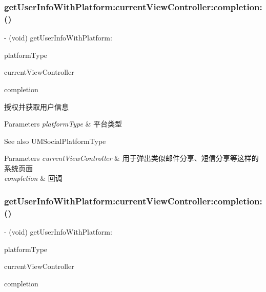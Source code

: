\subsubsection{\texorpdfstring{get\+User\+Info\+With\+Platform\+:current\+View\+Controller\+:completion\+:()}{getUserInfoWithPlatform:currentViewController:completion:()}\hspace{0.1cm}{\footnotesize\ttfamily [1/2]}}
{\footnotesize\ttfamily -\/ (void) get\+User\+Info\+With\+Platform\+: \begin{DoxyParamCaption}\item[{(U\+M\+Social\+Platform\+Type)}]{platform\+Type }\item[{currentViewController:(id)}]{current\+View\+Controller }\item[{completion:(U\+M\+Social\+Request\+Completion\+Handler)}]{completion }\end{DoxyParamCaption}}

授权并获取用户信息 
\begin{DoxyParams}{Parameters}
{\em platform\+Type} & 平台类型 \\
\hline
\end{DoxyParams}
\begin{DoxySeeAlso}{See also}
U\+M\+Social\+Platform\+Type 
\end{DoxySeeAlso}

\begin{DoxyParams}{Parameters}
{\em current\+View\+Controller} & 用于弹出类似邮件分享、短信分享等这样的系统页面 \\
\hline
{\em completion} & 回调 \\
\hline
\end{DoxyParams}
\mbox{\label{interface_u_m_social_manager_a156a1ca268b414b55c54138319c9e3f2}} 
\subsubsection{\texorpdfstring{get\+User\+Info\+With\+Platform\+:current\+View\+Controller\+:completion\+:()}{getUserInfoWithPlatform:currentViewController:completion:()}\hspace{0.1cm}{\footnotesize\ttfamily [2/2]}}
{\footnotesize\ttfamily -\/ (void) get\+User\+Info\+With\+Platform\+: \begin{DoxyParamCaption}\item[{(U\+M\+Social\+Platform\+Type)}]{platform\+Type }\item[{currentViewController:(id)}]{current\+View\+Controller }\item[{completion:(U\+M\+Social\+Request\+Completion\+Handler)}]{completion }\end{DoxyParamCaption}}

